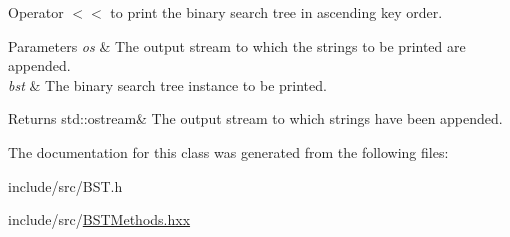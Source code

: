 Operator $<$$<$ to print the binary search tree in ascending key order. 


\begin{DoxyParams}{Parameters}
{\em os} & The output stream to which the strings to be printed are appended. \\
\hline
{\em bst} & The binary search tree instance to be printed. \\
\hline
\end{DoxyParams}
\begin{DoxyReturn}{Returns}
std\+::ostream\& The output stream to which strings have been appended. 
\end{DoxyReturn}


The documentation for this class was generated from the following files\+:\begin{DoxyCompactItemize}
\item 
include/src/B\+S\+T.\+h\item 
include/src/\hyperlink{BSTMethods_8hxx}{B\+S\+T\+Methods.\+hxx}\end{DoxyCompactItemize}
